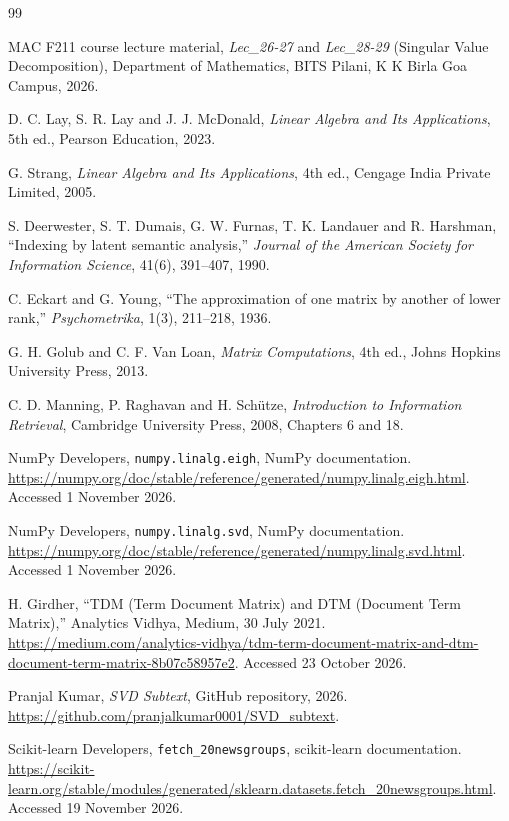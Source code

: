 \documentclass[12pt,a4paper]{report}
\theoremstyle{plain}
\theoremstyle{definition}
\theoremstyle{remark}
\theoremstyle{definition}
\begin{document}
\begin{thebibliography}{99}

 MAC F211 course lecture material, \emph{Lec\_26-27} and \emph{Lec\_28-29} (Singular Value Decomposition), Department of Mathematics, BITS Pilani, K K Birla Goa Campus, 2026.

 D. C. Lay, S. R. Lay and J. J. McDonald, \emph{Linear Algebra and Its Applications}, 5th ed., Pearson Education, 2023.

 G. Strang, \emph{Linear Algebra and Its Applications}, 4th ed., Cengage India Private Limited, 2005.

 S. Deerwester, S. T. Dumais, G. W. Furnas, T. K. Landauer and R. Harshman, ``Indexing by latent semantic analysis,'' \emph{Journal of the American Society for Information Science}, 41(6), 391--407, 1990.

 C. Eckart and G. Young, ``The approximation of one matrix by another of lower rank,'' \emph{Psychometrika}, 1(3), 211--218, 1936.

 G. H. Golub and C. F. Van Loan, \emph{Matrix Computations}, 4th ed., Johns Hopkins University Press, 2013.

C. D. Manning, P. Raghavan and H. Sch\"utze,
\emph{Introduction to Information Retrieval},
Cambridge University Press, 2008, Chapters 6 and 18.

 NumPy Developers, \texttt{numpy.linalg.eigh}, NumPy documentation. \url{https://numpy.org/doc/stable/reference/generated/numpy.linalg.eigh.html}. Accessed 1 November 2026.

 NumPy Developers, \texttt{numpy.linalg.svd}, NumPy documentation. \url{https://numpy.org/doc/stable/reference/generated/numpy.linalg.svd.html}. Accessed 1 November 2026.

 H. Girdher, ``TDM (Term Document Matrix) and DTM (Document Term Matrix),'' Analytics Vidhya, Medium, 30 July 2021. \url{https://medium.com/analytics-vidhya/tdm-term-document-matrix-and-dtm-document-term-matrix-8b07c58957e2}. Accessed 23 October 2026.

 Pranjal Kumar, \emph{SVD Subtext}, GitHub repository, 2026. \url{https://github.com/pranjalkumar0001/SVD_subtext}.

 Scikit-learn Developers, \texttt{fetch\_20newsgroups}, scikit-learn documentation. \url{https://scikit-learn.org/stable/modules/generated/sklearn.datasets.fetch_20newsgroups.html}. Accessed 19 November 2026.

\end{thebibliography}
\end{document}
